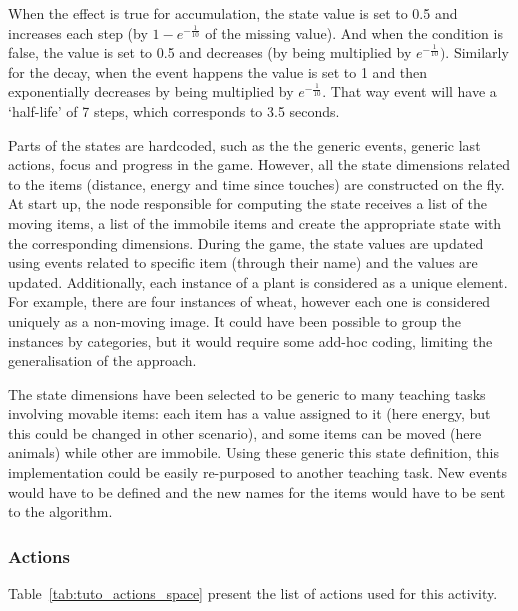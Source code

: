 When the effect is true for accumulation, the state value is set to 0.5 and increases each step (by $1-e^{-\frac{1}{10}}$ of the missing value). And when the condition is false, the value is set to 0.5 and decreases (by being multiplied by $e^{-\frac{1}{10}})$. Similarly for the decay, when the event happens the value is set to 1 and then exponentially decreases by being multiplied by $e^{-\frac{1}{10}}$. That way event will have a `half-life' of 7 steps, which corresponds to 3.5 seconds.

Parts of the states are hardcoded, such as the the generic events, generic last actions, focus and progress in the game. However, all the state dimensions related to the items (distance, energy and time since touches) are constructed on the fly. At start up, the node responsible for computing the state receives a list of the moving items, a list of the immobile items and create the appropriate state with the corresponding dimensions. During the game, the state values are updated using events related to specific item (through their name) and the values are updated. Additionally, each instance of a plant is considered as a unique element. For example, there are four instances of wheat, however each one is considered uniquely as a non-moving image. It could have been possible to group the instances by categories, but it would require some add-hoc coding, limiting the generalisation of the approach. 

The state dimensions have been selected to be generic to many teaching tasks involving movable items: each item has a value assigned to it (here energy, but this could be changed in other scenario), and some items can be moved (here animals) while other are immobile. Using these generic this state definition, this implementation could be easily re-purposed to another teaching task. New events would have to be defined and the new names for the items would have to be sent to the algorithm.

\subsubsection{Actions}

Table~\ref{tab:tuto_actions_space} present the list of actions used for this activity.

